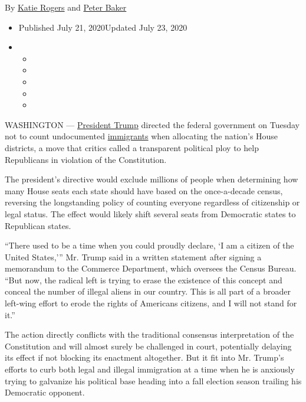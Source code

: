 By \href{https://www.nytimes3xbfgragh.onion/by/katie-rogers}{Katie
Rogers} and
\href{https://www.nytimes3xbfgragh.onion/by/peter-baker}{Peter Baker}

\begin{itemize}
\item
  Published July 21, 2020Updated July 23, 2020
\item
  \begin{itemize}
  \item
  \item
  \item
  \item
  \item
  \end{itemize}
\end{itemize}

WASHINGTON ---
\href{https://www.nytimes3xbfgragh.onion/2020/07/23/us/trump-immigration-nation-netflix.html}{President
Trump} directed the federal government on Tuesday not to count
undocumented
\href{https://www.nytimes3xbfgragh.onion/2020/07/23/us/trump-immigration-nation-netflix.html}{immigrants}
when allocating the nation's House districts, a move that critics called
a transparent political ploy to help Republicans in violation of the
Constitution.

The president's directive would exclude millions of people when
determining how many House seats each state should have based on the
once-a-decade census, reversing the longstanding policy of counting
everyone regardless of citizenship or legal status. The effect would
likely shift several seats from Democratic states to Republican states.

``There used to be a time when you could proudly declare, `I am a
citizen of the United States,''' Mr. Trump said in a written statement
after signing a memorandum to the Commerce Department, which oversees
the Census Bureau. ``But now, the radical left is trying to erase the
existence of this concept and conceal the number of illegal aliens in
our country. This is all part of a broader left-wing effort to erode the
rights of Americans citizens, and I will not stand for it.''

The action directly conflicts with the traditional consensus
interpretation of the Constitution and will almost surely be challenged
in court, potentially delaying its effect if not blocking its enactment
altogether. But it fit into Mr. Trump's efforts to curb both legal and
illegal immigration at a time when he is anxiously trying to galvanize
his political base heading into a fall election season trailing his
Democratic opponent.

